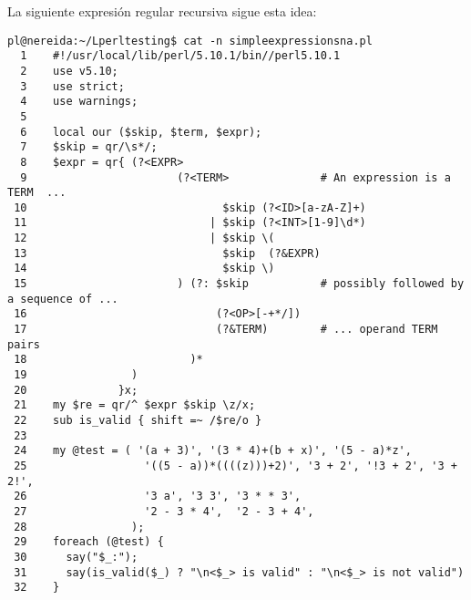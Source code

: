  La siguiente expresión regular recursiva sigue esta idea:
\begin{latexonly}
\begin{verbatim}
pl@nereida:~/Lperltesting$ cat -n simpleexpressionsna.pl
  1    #!/usr/local/lib/perl/5.10.1/bin//perl5.10.1
  2    use v5.10;
  3    use strict;
  4    use warnings;
  5  
  6    local our ($skip, $term, $expr);
  7    $skip = qr/\s*/;
  8    $expr = qr{ (?<EXPR>
  9                       (?<TERM>              # An expression is a TERM  ...
 10                              $skip (?<ID>[a-zA-Z]+)
 11                            | $skip (?<INT>[1-9]\d*)
 12                            | $skip \(
 13                              $skip  (?&EXPR)
 14                              $skip \)
 15                       ) (?: $skip           # possibly followed by a sequence of ...
 16                             (?<OP>[-+*/])
 17                             (?&TERM)        # ... operand TERM pairs
 18                         )*
 19                )
 20              }x;
 21    my $re = qr/^ $expr $skip \z/x;
 22    sub is_valid { shift =~ /$re/o }
 23  
 24    my @test = ( '(a + 3)', '(3 * 4)+(b + x)', '(5 - a)*z',
 25                  '((5 - a))*((((z)))+2)', '3 + 2', '!3 + 2', '3 + 2!',
 26                  '3 a', '3 3', '3 * * 3',
 27                  '2 - 3 * 4',  '2 - 3 + 4',
 28                );
 29    foreach (@test) {
 30      say("$_:");
 31      say(is_valid($_) ? "\n<$_> is valid" : "\n<$_> is not valid")
 32    }
\end{verbatim}
\end{latexonly}
